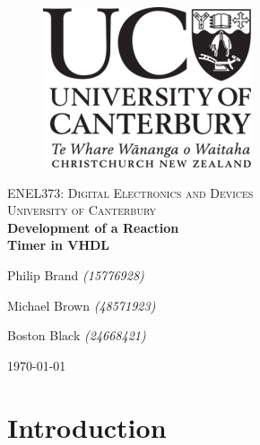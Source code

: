 \documentclass[11pt]{article}
\begin{document}
\begin{titlepage}
	\begin{center}
		\begin{figure}
			\includegraphics[right]{logo.png}
		\end{figure}
		\vspace*{1cm}
		\textsc{\large ENEL373: Digital Electronics and Devices}\\[0.5cm]
		\textsc{\Large University of Canterbury}\\[3.5cm]
		\linespread{1}
		{\Huge\bfseries{Development of a Reaction \\[0.3cm] Timer in VHDL}} \\
		\vspace*{2cm}
		{\Huge Philip Brand \textit{\Large(15776928)}\\\par}
		{\Huge Michael Brown \textit{\Large(48571923)}\\\par}
		{\Huge Boston Black \textit{\Large(24668421)}\\\par}
		\vspace*{3cm}
		{\LARGE \today}
	\end{center}
\end{titlepage}
\restoregeometry

\fancyhead{}
\fancyhead[R]{\small{\today}}


\renewcommand{\baselinestretch}{1.3}\normalsize
\setlength{\cftbeforesecskip}{0.3em}
\renewcommand{\cftsecleader}{\cftdotfill{\cftdotsep}}
\tableofcontents\thispagestyle{fancy}
\renewcommand{\baselinestretch}{1}\normalsize

\newpage
{}

\section{Introduction}
\end{document}
